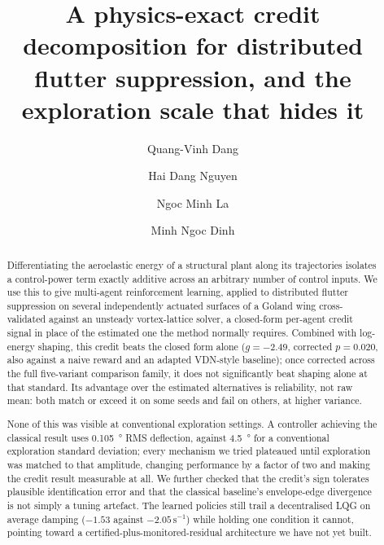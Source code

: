 \documentclass[preprint,11pt,authoryear]{elsarticle}
\begin{document}
\begin{frontmatter}

\title{A physics-exact credit decomposition for distributed flutter
suppression, and the exploration scale that hides it}

\author[buv]{Quang-Vinh Dang}
\author[xtech]{Hai Dang Nguyen}
\author[vgu]{Ngoc Minh La}
\author[mu]{Minh Ngoc Dinh}


\begin{abstract}
Differentiating the aeroelastic energy of a structural plant along its
trajectories isolates a control-power term exactly additive across an
arbitrary number of control inputs. We use this to give multi-agent
reinforcement learning, applied to distributed flutter suppression on several
independently actuated surfaces of a Goland wing cross-validated against an
unsteady vortex-lattice solver, a closed-form per-agent credit signal in place
of the estimated one the method normally requires. Combined with log-energy
shaping, this credit beats the closed form alone ($g=-2.49$, corrected $p=0.020$, also against a
naive reward and an adapted VDN-style baseline); once corrected across the
full five-variant comparison family, it does not significantly beat shaping
alone at that standard. Its advantage over the estimated alternatives is reliability, not raw
mean: both match or exceed it on some seeds and fail on others, at higher
variance.

None of this was visible at conventional exploration settings. A controller
achieving the classical result uses \SI{0.105}{\degree} RMS deflection,
against \SI{4.5}{\degree} for a conventional exploration standard deviation;
every mechanism we tried plateaued until exploration was matched to that
amplitude, changing performance by a factor of two and making the credit
result measurable at all. We further checked that the credit's sign tolerates plausible identification
error and that the classical baseline's envelope-edge divergence is not simply
a tuning artefact. The learned policies still trail a decentralised LQG on
average damping ($-1.53$ against $-2.05\,\mathrm{s}^{-1}$) while holding one
condition it cannot, pointing toward a certified-plus-monitored-residual
architecture we have not yet built.
\end{abstract}


\end{frontmatter}
\end{document}
